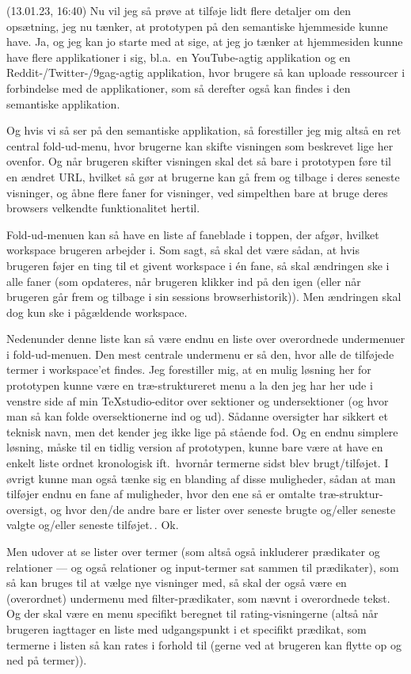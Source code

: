 \documentclass{report}
\begin{document}
(13.01.23, 16:40) Nu vil jeg så prøve at tilføje lidt flere detaljer om den opsætning, jeg nu tænker, at prototypen på den semantiske hjemmeside kunne have. Ja, og jeg kan jo starte med at sige, at jeg jo tænker at hjemmesiden kunne have flere applikationer i sig, bl.a.\ en YouTube-agtig applikation og en Reddit-/Twitter-/9gag-agtig applikation, hvor brugere så kan uploade ressourcer i forbindelse med de applikationer, som så derefter også kan findes i den semantiske applikation.

Og hvis vi så ser på den semantiske applikation, så forestiller jeg mig altså en ret central fold-ud-menu, hvor brugerne kan skifte visningen som beskrevet lige her ovenfor. Og når brugeren skifter visningen skal det så bare i prototypen føre til en ændret URL, hvilket så gør at brugerne kan gå frem og tilbage i deres seneste visninger, og åbne flere faner for visninger, ved simpelthen bare at bruge deres browsers velkendte funktionalitet hertil.

Fold-ud-menuen kan så have en liste af faneblade i toppen, der afgør, hvilket workspace brugeren arbejder i. Som sagt, så skal det være sådan, at hvis brugeren føjer en ting til et givent workspace i én fane, så skal ændringen ske i alle faner (som opdateres, når brugeren klikker ind på den igen (eller når brugeren går frem og tilbage i sin sessions browserhistorik)). Men ændringen skal dog kun ske i pågældende workspace.

Nedenunder denne liste kan så være endnu en liste over overordnede undermenuer i fold-ud-menuen. Den mest centrale undermenu er så den, hvor alle de tilføjede termer i workspace'et findes. Jeg forestiller mig, at en mulig løsning her for prototypen kunne være en træ-struktureret menu a la den jeg har her ude i venstre side af min TeXstudio-editor over sektioner og undersektioner (og hvor man så kan folde oversektionerne ind og ud). Sådanne oversigter har sikkert et teknisk navn, men det kender jeg ikke lige på stående fod. Og en endnu simplere løsning, måske til en tidlig version af prototypen, kunne bare være at have en enkelt liste ordnet kronologisk ift.\ hvornår termerne sidst blev brugt/tilføjet. I øvrigt kunne man også tænke sig en blanding af disse muligheder, sådan at man tilføjer endnu en fane af muligheder, hvor den ene så er omtalte træ-struktur-oversigt, og hvor den/de andre bare er lister over seneste brugte og/eller seneste valgte og/eller seneste tilføjet.\,. Ok.

Men udover at se lister over termer (som altså også inkluderer prædikater og relationer --- og også relationer og input-termer sat sammen til prædikater), som så kan bruges til at vælge nye visninger med, så skal der også være en (overordnet) undermenu med filter-prædikater, som nævnt i overordnede tekst. Og der skal være en menu specifikt beregnet til rating-visningerne (altså når brugeren iagttager en liste med udgangspunkt i et specifikt prædikat, som termerne i listen så kan rates i forhold til (gerne ved at brugeren kan flytte op og ned på termer)). 
\end{document}
